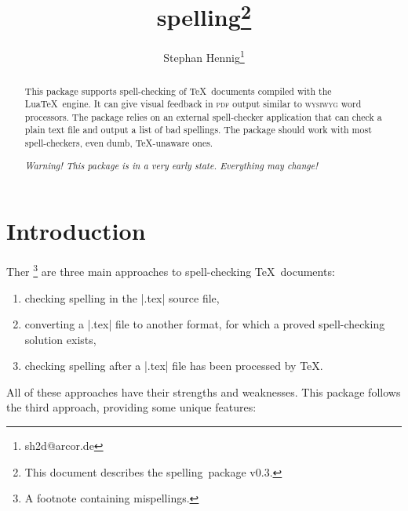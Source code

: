 \documentclass[11pt]{article}
\newcommand*{\pkg}{\textsf{spelling}}
\newcommand*{\acr}[1]{\mbox{\scshape#1}}
\begin{document}
\author{Stephan Hennig\thanks{sh2d@arcor.de}}
\title{\pkg\thanks{This document describes the \pkg\ package v0.3.}}
\maketitle


\begin{abstract}
  This package supports spell-checking of \TeX\ documents compiled with
  the Lua\TeX\ engine.  It can give visual feedback in \acr{pdf} output
  similar to \acr{wysiwyg} word processors.  The package relies on an
  external spell-checker application that can check a plain text file
  and output a list of bad spellings.  The package should work with most
  spell-checkers, even dumb, \TeX-unaware ones.

  \emph{Warning!  This package is in a very early state.  Everything may
    change!}
\end{abstract}

\begin{multicols}{2}
\small
\makeatletter
\renewcommand{\@tocrmarg}{2.55em plus1fil}
\makeatother
\tableofcontents
\end{multicols}


\section{Introduction}
\label{sec:intro}

Ther%
\footnote{A footnote containing mispellings.}
%
are three main approaches to spell-checking \TeX\ documents:

\begin{enumerate}

\item checking spelling in the |.tex| source file,

\item converting a |.tex| file to another format, for which a proved
  spell-checking solution exists,

\item checking spelling after a |.tex| file has been processed by \TeX.

\end{enumerate}

All of these approaches have their strengths and weaknesses.  This
package follows the third approach, providing some unique features:
\end{document}
